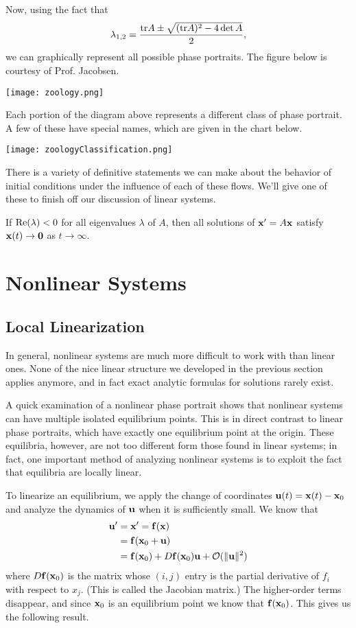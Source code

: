 \documentclass[../m082main.tex]{subfiles}
\begin{document}
Now, using the fact that
\[ \lambda_{1,2} = \frac{\textrm{tr} A \pm \sqrt{(\textrm{tr} A)^2 - 4 \det A}}{2}, \]
we can graphically represent all possible phase portraits.
The figure below is courtesy of Prof. Jacobsen.
\begin{center}
    \texttt{[image: zoology.png]}
\end{center}
Each portion of the diagram above represents a different class of phase portrait.
A few of these have special names, which are given in the chart below.
\begin{center}
    \texttt{[image: zoologyClassification.png]}
\end{center}

There is a variety of definitive statements we can make about the behavior of initial conditions under the influence of each of these flows.
We'll give one of these to finish off our discussion of linear systems.

\begin{theorem}
    If $\textrm{Re} (\lambda) < 0$ for all eigenvalues $\lambda$ of $A$, then all solutions of $\mathbf{x}' = A \mathbf{x}$ satisfy $\mathbf{x}(t) \to \mathbf{0}$ as $t \to \infty$.
\end{theorem}

\section{Nonlinear Systems}
\subsection{Local Linearization}
In general, nonlinear systems are much more difficult to work with than linear ones.
None of the nice linear structure we developed in the previous section applies anymore, and in fact exact analytic formulas for solutions rarely exist.

A quick examination of a nonlinear phase portrait shows that nonlinear systems can have multiple isolated equilibrium points.
This is in direct contrast to linear phase portraits, which have exactly one equilibrium point at the origin.
These equilibria, however, are not too different form those found in linear systems; in fact, one important method of analyzing nonlinear systems is to exploit the fact that equilibria are locally linear.

To linearize an equilibrium, we apply the change of coordinates $\mathbf{u}(t) = \mathbf{x}(t) - \mathbf{x}_0$ and analyze the dynamics of $\mathbf{u}$ when it is sufficiently small.
We know that
\begin{align*}
    \mathbf{u}' &= \mathbf{x}'= \mathbf{f} (\mathbf{x}) \\
    &= \mathbf{f} (\mathbf{x}_0 + \mathbf{u}) \\
    &= \mathbf{f} (\mathbf{x}_0) + D \mathbf{f} (\mathbf{x}_0) \mathbf{u} + \mathcal{O} (\|\mathbf{u}\|^2)
\end{align*}
where $D \mathbf{f} (\mathbf{x}_0)$ is the matrix whose $(i,j)$ entry is the partial derivative of $f_i$ with respect to $x_j$.
(This is called the Jacobian matrix.)
The higher-order terms disappear, and since $\mathbf{x}_0$ is an equilibrium point we know that $\mathbf{f}(\mathbf{x}_0)$.
This gives us the following result.
\end{document}
